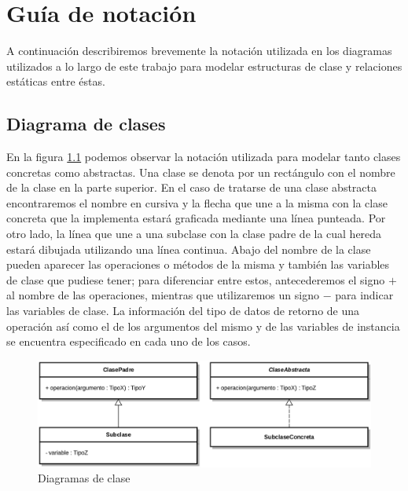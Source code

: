 \chapter{Guía de notación}
\label{ape:notacion}

A continuación describiremos brevemente la notación utilizada en los diagramas utilizados a lo largo de este trabajo para modelar estructuras de clase y relaciones estáticas entre éstas.

\section{Diagrama de clases}

En la figura \ref{fig:png_arquitectura} podemos observar la notación utilizada para modelar tanto clases concretas como abstractas. Una clase se denota por un rectángulo con el nombre de la clase en la parte superior. En el caso de tratarse de una clase abstracta encontraremos el nombre en cursiva y la flecha que une a la misma con la clase concreta que la implementa estará graficada mediante una línea punteada. Por otro lado, la línea que une a una subclase con la clase padre de la cual hereda estará dibujada utilizando una línea continua. Abajo del nombre de la clase pueden aparecer las operaciones o métodos de la misma y también las variables de clase que pudiese tener; para diferenciar entre estos, antecederemos el signo $+$ al nombre de las operaciones, mientras que utilizaremos un signo $-$ para indicar las variables de clase. La información del tipo de datos de retorno de una operación así como el de los argumentos del mismo y de las variables de instancia se encuentra especificado en cada uno de los casos. 

\begin{figure}[H]
  	\centering
	\includegraphics[scale=0.17]{img/ref_clases.png}
	\caption{Diagramas de clase}
  	\label{fig:png_arquitectura}
\end{figure}

